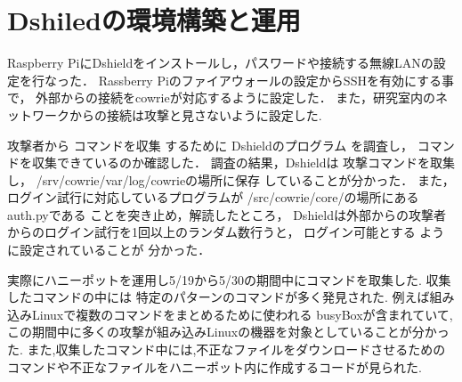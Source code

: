 \documentclass{entry}
\begin{document}
\section{Dshiledの環境構築と運用}

Raspberry PiにDshieldをインストールし，パスワードや接続する無線LANの設定を行なった．
Rassberry Piのファイアウォールの設定からSSHを有効にする事で，
外部からの接続をcowrieが対応するように設定した．
また，研究室内のネットワークからの接続は攻撃と見さないように設定した.


攻撃者から
コマンドを収集
するために
Dshieldのプログラム
を調査し，
コマンドを収集できているのか確認した．
調査の結果，Dshieldは
攻撃コマンドを取集し，
/srv/cowrie/var/log/cowrieの場所に保存
していることが分かった．
また，ログイン試行に対応しているプログラムが
/src/cowrie/core/の場所にあるauth.pyである
ことを突き止め，解読したところ，
Dshieldは外部からの攻撃者
からのログイン試行を1回以上のランダム数行うと，
ログイン可能とする
ように設定されていることが
分かった．


実際にハニーポットを運用し5/19から5/30の期間中にコマンドを取集した.
収集したコマンドの中には
特定のパターンのコマンドが多く発見された.
例えば組み込みLinuxで複数のコマンドをまとめるために使われる
busyBoxが含まれていて,
この期間中に多くの攻撃が組み込みLinuxの機器を対象としていることが分かった.
また,収集したコマンド中には,不正なファイルをダウンロードさせるための
コマンドや不正なファイルをハニーポット内に作成するコードが見られた.
\end{document}
